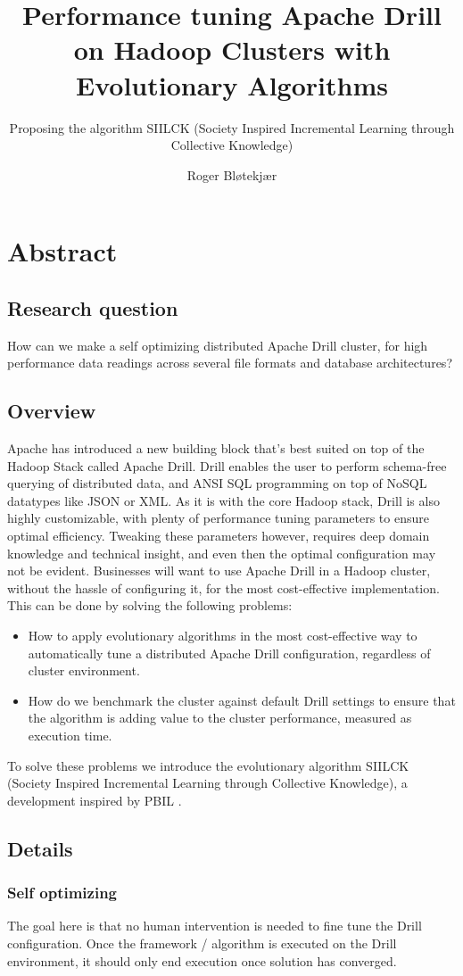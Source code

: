 \documentclass[a4paper,english]{report}
\title{Performance tuning Apache Drill on Hadoop Clusters with Evolutionary Algorithms}
\subtitle{Proposing the algorithm SIILCK (Society Inspired Incremental Learning through Collective Knowledge)}
\author{Roger Bløtekjær}
\begin{document}
	\duoforside[dept={Institutt for informatikk},
	program={Informatikk: språkteknologi},
	short]
	\section{Abstract}
		\subsection{Research question}
		How can we make a self optimizing distributed Apache Drill cluster, for high performance data readings across several file formats and database architectures?
		\subsection{Overview}
		Apache has introduced a new building block that's best suited on top of the Hadoop Stack called Apache Drill. Drill enables the user to perform schema-free querying of distributed data, and ANSI SQL programming on top of NoSQL datatypes like JSON or XML. As it is with the core Hadoop stack, Drill is also highly customizable, with plenty of performance tuning parameters to ensure optimal efficiency. Tweaking these parameters however, requires deep domain knowledge and technical insight, and even then the optimal configuration may not be evident. Businesses will want to use Apache Drill in a Hadoop cluster, without the hassle of configuring it, for the most cost-effective implementation. This can be done by solving the following problems:
		\begin{itemize}
			\item How to apply evolutionary algorithms in the most cost-effective way to automatically tune a distributed Apache Drill configuration, regardless of cluster environment.
			\item How do we benchmark the cluster against default Drill settings to ensure that the algorithm is adding value to the cluster performance, measured as execution time.
		\end{itemize}
		To solve these problems we introduce the evolutionary algorithm SIILCK (Society Inspired Incremental Learning through Collective Knowledge), a development inspired by PBIL \cite{pbil}.
		\subsection{Details}
			\subsubsection{Self optimizing}
			The goal here is that no human intervention is needed to fine tune the Drill configuration. Once the framework / algorithm is executed on the Drill environment, it should only end execution once solution has converged.
\end{document}
